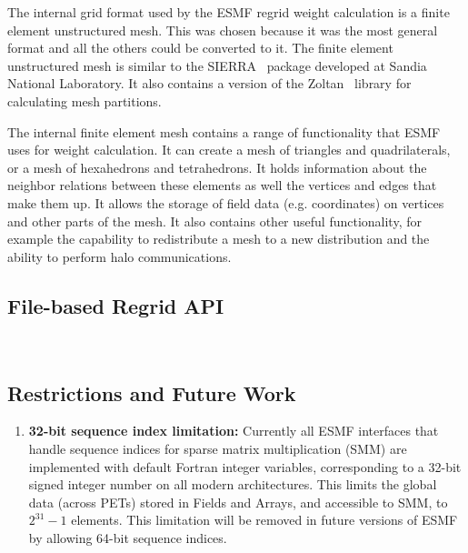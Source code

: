 The internal grid format used by the ESMF regrid weight calculation is a finite element
unstructured mesh. This was chosen because it was the most general format and all the others could be 
converted to it. The finite element unstructured mesh is similar to the SIERRA~\cite{Sierra} package 
developed at Sandia National Laboratory. It also contains a version of the Zoltan~\cite{Zoltan} library 
for calculating mesh partitions. 

The internal finite element mesh contains a range of functionality that 
ESMF uses for weight calculation. It can create a mesh of triangles and quadrilaterals, or a mesh of hexahedrons and  
tetrahedrons. It holds information about the neighbor relations between these elements as well the
vertices and edges that make them up. It allows the storage of field data (e.g. coordinates) on 
vertices and other parts of the mesh. It also contains other useful functionality,
for example the capability to redistribute a mesh to a new distribution and the ability to perform halo communications. 

\subsection{File-based Regrid API}~\label{sec:filebasedregrid}


\subsection{Restrictions and Future Work}
\begin{enumerate}

\item {\bf 32-bit sequence index limitation:} Currently all ESMF interfaces that handle sequence indices for sparse matrix multiplication (SMM) are implemented with default Fortran integer variables, corresponding to a 32-bit signed integer number on all modern architectures. This limits the global data (across PETs) stored in Fields and Arrays, and accessible to SMM, to $2^{31}-1$ elements. This limitation will be removed in future versions of ESMF by allowing 64-bit sequence indices.

\end{enumerate}
